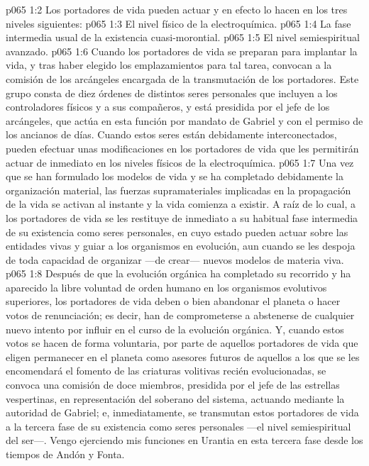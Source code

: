 \vs p065 1:2 Los portadores de vida pueden actuar y en efecto lo hacen en los tres niveles siguientes:
\vs p065 1:3 El nivel físico de la electroquímica.
\vs p065 1:4 La fase intermedia usual de la existencia cuasi\hyp{}morontial.
\vs p065 1:5 El nivel semiespiritual avanzado.
\vs p065 1:6 \pc Cuando los portadores de vida se preparan para implantar la vida, y tras haber elegido los emplazamientos para tal tarea, convocan a la comisión de los arcángeles encargada de la transmutación de los portadores. Este grupo consta de diez órdenes de distintos seres personales que incluyen a los controladores físicos y a sus compañeros, y está presidida por el jefe de los arcángeles, que actúa en esta función por mandato de Gabriel y con el permiso de los ancianos de días. Cuando estos seres están debidamente interconectados, pueden efectuar unas modificaciones en los portadores de vida que les permitirán actuar de inmediato en los niveles físicos de la electroquímica.
\vs p065 1:7 Una vez que se han formulado los modelos de vida y se ha completado debidamente la organización material, las fuerzas supramateriales implicadas en la propagación de la vida se activan al instante y la vida comienza a existir. A raíz de lo cual, a los portadores de vida se les restituye de inmediato a su habitual fase intermedia de su existencia como seres personales, en cuyo estado pueden actuar sobre las entidades vivas y guiar a los organismos en evolución, aun cuando se les despoja de toda capacidad de organizar ---de crear--- nuevos modelos de materia viva.
\vs p065 1:8 Después de que la evolución orgánica ha completado su recorrido y ha aparecido la libre voluntad de orden humano en los organismos evolutivos superiores, los portadores de vida deben o bien abandonar el planeta o hacer votos de renunciación; es decir, han de comprometerse a abstenerse de cualquier nuevo intento por influir en el curso de la evolución orgánica. Y, cuando estos votos se hacen de forma voluntaria, por parte de aquellos portadores de vida que eligen permanecer en el planeta como asesores futuros de aquellos a los que se les encomendará el fomento de las criaturas volitivas recién evolucionadas, se convoca una comisión de doce miembros, presidida por el jefe de las estrellas vespertinas, en representación del soberano del sistema, actuando mediante la autoridad de Gabriel; e, inmediatamente, se transmutan estos portadores de vida a la tercera fase de su existencia como seres personales ---el nivel semiespiritual del ser---. Vengo ejerciendo mis funciones en Urantia en esta tercera fase desde los tiempos de Andón y Fonta.
